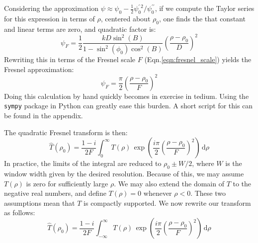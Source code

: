 \documentclass{article}
\theoremstyle{plain}
\begin{document}
        Considering the approximation
        $%
            \psi\approx%
            \psi_{0}-\frac{1}{2}\psi^{\prime\,2}_{0}/\psi^{\prime\prime}_{0}%
        $,
        if we compute the Taylor series for this expression in terms of
        $\rho$, centered about $\rho_{0}$, one finds the that constant and
        linear terms are zero, and quadratic factor is:
        \begin{equation}
            \psi_{F}=
            \frac{1}{2}
            \frac{kD\sin^{2}(B)}{1-\sin^{2}(\phi_{0})\cos^{2}(B)}
            \left(
                \frac{\rho-\rho_{0}}{D}
            \right)^{2}
        \end{equation}
        Rewriting this in terms of the Fresnel scale $F$
        (Eqn.\ref{eqn:fresnel_scale}) yields the Fresnel approximation:
        \begin{equation}
            \psi_{F}
            =\frac{\pi}{2}\left(
                \frac{\rho-\rho_{0}}{F}
            \right)^{2}
        \end{equation}
        Doing this calculation by hand quickly becomes in exercise in tedium.
        Using the \texttt{sympy} package in Python can greatly ease this burden.
        A short script for this can be found in the appendix.
        \par\hfill\par
        The quadratic Fresnel transform is then:
        \begin{equation}
            \hat{T}(\rho_{0})
            =\frac{1-i}{2F}\int_{0}^{\infty}
                T(\rho)\,\exp\left(
                    \frac{i\pi}{2}\left(\frac{\rho-\rho_{0}}{F}\right)^{2}
                \right)\,\textrm{d}\rho
        \end{equation}
        In practice, the limits of the integral are reduced to
        $\rho_{0}\pm{W}/2$, where $W$ is the window width given by the
        desired resolution. Because of this, we may assume
        $T(\rho)$ is zero for sufficiently large $\rho$.
        We may also extend the domain of $T$ to the negative real numbers, and
        define $T(\rho)=0$ whenever $\rho<0$. These two assumptions mean that
        $T$ is compactly supported. We now rewrite our transform as follows:
        \begin{equation}
            \hat{T}(\rho_{0})
            =\frac{1-i}{2F}\int_{-\infty}^{\infty}
                T(\rho)\,\exp\left(
                    \frac{i\pi}{2}\left(\frac{\rho-\rho_{0}}{F}\right)^{2}
                \right)\,\textrm{d}\rho
        \end{equation}
\end{document}
